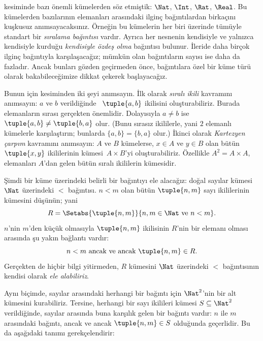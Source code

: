 


\begin{explain}
 kesiminde bazı önemli kümelerden söz etmiştik:
$\Nat$, $\Int$, $\Rat$, $\Real$. Bu kümelerden bazılarının elemanları arasındaki
ilginç bağıntılardan birkaçını kuşkusuz anımsayacaksınız. Örneğin bu kümelerin
her biri üzerinde tümüyle standart bir \emph{sıralama bağıntısı} vardır. Ayrıca
her nesnenin kendisiyle ve yalnızca kendisiyle kurduğu \emph{kendisiyle özdeş
olma} bağıntısı bulunur. İleride daha birçok ilginç bağıntıyla karşılaşacağız; mümkün olan
bağıntıların sayısı ise daha da fazladır. Ancak bunları gözden geçirmeden önce,
bağıntılara özel bir küme türü olarak bakabileceğimize dikkat çekerek
başlayacağız.

Bunun için  kesiminden iki şeyi anımsayın. İlk olarak
\emph{sıralı ikili} kavramını anımsayın: $a$ ve $b$ verildiğinde
~$\tuple{a, b}$ ikilisini oluşturabiliriz. Burada elemanların sırası gerçekten
önemlidir. Dolayısıyla $a \neq b$ ise $\tuple{a, b} \neq \tuple{b, a}$ olur.
(Bunu sırasız ikililerle, yani $2$ elemanlı kümelerle karşılaştırın; bunlarda
$\{a, b\}=\{b, a\}$ olur.) İkinci olarak \emph{Kartezyen çarpım} kavramını
anımsayın: $A$ ve $B$ kümelerse, $x \in A$ ve $y \in B$ olan bütün
$\tuple{x, y}$ ikililerinin kümesi~$A \times B$'yi oluşturabiliriz. Özellikle
$A^{2}= A \times A$, elemanları $A$'dan gelen bütün sıralı ikililerin kümesidir.

Şimdi bir küme üzerindeki belirli bir bağıntıyı ele alacağız: doğal sayılar
kümesi~$\Nat$ üzerindeki $<$ bağıntısı. $n<m$ olan bütün $\tuple{n, m}$ sayı
ikililerinin kümesini düşünün; yani
\[
  R=\Setabs{\tuple{n, m}}{n, m \in \Nat \text{ ve } n<m}.
\]
$n$'nin $m$'den küçük olmasıyla $\tuple{n, m}$ ikilisinin $R$'nin bir elemanı
olması arasında şu yakın bağlantı vardır:
\[
      n<m\text{ ancak ve ancak }\tuple{n, m} \in R.
\]
Gerçekten de hiçbir bilgi yitirmeden, $R$ kümesini $\Nat$ üzerindeki $<$
bağıntısının kendisi olarak \emph{ele alabiliriz}.

Aynı biçimde, sayılar arasındaki herhangi bir bağıntı için $\Nat^{2}$'nin bir
alt kümesini kurabiliriz. Tersine, herhangi bir sayı ikilileri kümesi
$S \subseteq \Nat^{2}$ verildiğinde, sayılar arasında buna karşılık gelen bir
bağıntı vardır: $n$ ile $m$ arasındaki bağıntı, ancak ve ancak
$\tuple{n, m} \in S$ olduğunda geçerlidir. Bu da aşağıdaki tanımı gerekçelendirir:
\end{explain}

